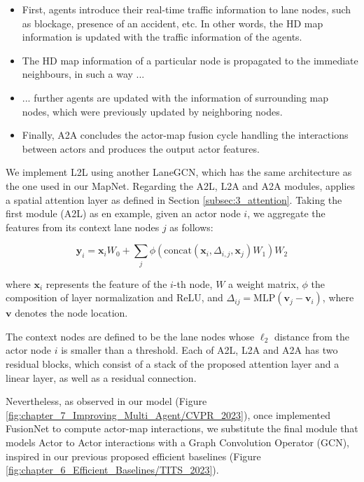 \begin{itemize}
	\item First, agents introduce their real-time traffic information to lane nodes, such as blockage, presence of an accident, etc. In other words, the HD map information is updated with the traffic information of the agents.
	\item The HD map information of a particular node is propagated to the immediate neighbours, in such a way ...
	\item ... further agents are updated with the information of surrounding map nodes, which were previously updated by neighboring nodes.
	\item Finally, A2A concludes the actor-map fusion cycle handling the interactions between actors and produces the output actor features.
	
\end{itemize}

We implement L2L using another LaneGCN, which has the same architecture as the one used in our MapNet. Regarding the A2L, L2A and A2A modules, \cite{liang2020learning} applies a spatial attention layer as defined in Section \ref{subsec:3_attention}. Taking the first module (A2L) as en example, given an actor node $i$, we aggregate the features from its context lane nodes $j$ as follows:

\begin{equation}
	\mathbf{y}_i = \mathbf{x}_i W_0 + \sum_j \phi ( \text{concat} (\mathbf{x}_i, \Delta_{i,j}, \mathbf{x}_j) W_1) W_2
	\label{equ:attention}
\end{equation}

where $\mathbf{x}_i$ represents the feature of the $i$-th node, $W$ a weight matrix, $\phi$ the composition of layer normalization and ReLU, and $\Delta_{ij} = \text{MLP}(\mathbf{v}_j - \mathbf{v}_i)$, where $\mathbf{v}$ denotes the node location.

The context nodes are defined to be the lane nodes whose $\ell_2$ distance from the actor node $i$ is smaller than a threshold. Each of A2L, L2A and A2A has two residual blocks, which consist of a stack of the proposed attention layer and a linear layer, as well as a residual connection. 

Nevertheless, as observed in our model (Figure \ref{fig:chapter_7_Improving_Multi_Agent/CVPR_2023}), once implemented FusionNet to compute actor-map interactions, we substitute the final module that models Actor to Actor interactions with a Graph Convolution Operator (GCN), inspired in our previous proposed efficient baselines (Figure \ref{fig:chapter_6_Efficient_Baselines/TITS_2023}). %

